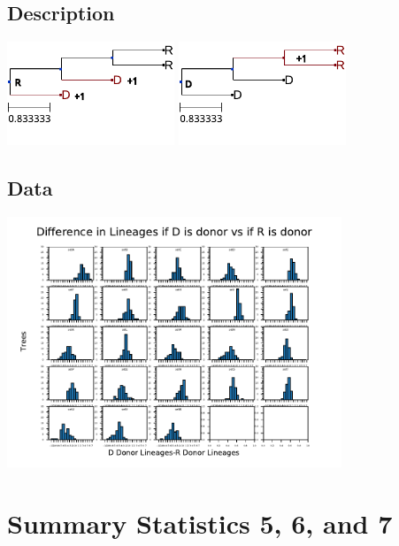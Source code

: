 \documentclass[
10pt,aspectratio=169,notheorems,hyperref={pdfauthor=whatever}
]{beamer}
\begin{document}
\subsection{Description}
\begin{frame}
  \centering
  \includegraphics[width=5cm, angle=0]{sumstat3example}
  \includegraphics[width=5cm, angle=0]{sumstat3example2}
\end{frame}

\subsection{Data}
\begin{frame}
  \centering
  \includegraphics[width=10cm, angle=0]{sumstat3hist}
\end{frame}

\section{Summary Statistics 5, 6, and 7}
\end{document}
